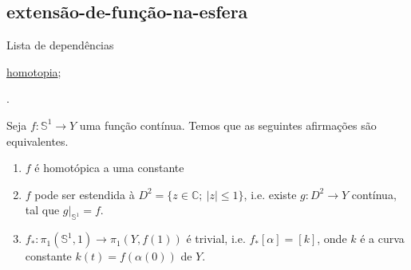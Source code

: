 \subsection{extensão-de-função-na-esfera} %
\label{extensão-de-função-na-esfera}
\begin{titlemize}{Lista de dependências}
	\item \hyperref[homotopia]{homotopia};
\end{titlemize}
.
\begin{lemma}
    Seja $f:\mathbb{S}^1 \rightarrow Y$ uma função contínua. Temos que as seguintes afirmações são equivalentes.

    \begin{enumerate}
        \item $f$ é homotópica a uma constante
        \item $f$ pode ser estendida à $D^2 = \{z \in \mathbb{C}; \ |z| \leq 1\}$, i.e. existe $g:D^2 \rightarrow Y$ contínua, tal que $g|_{\mathbb{S}^1} = f$.
        \item $f_*: \pi_1(\mathbb{S}^1, 1) \rightarrow \pi_1(Y, f(1))$ é trivial, i.e. $f_*[\alpha] = [k]$, onde $k$ é a curva constante $k(t) = f(\alpha(0))$ de $Y$.
    \end{enumerate}
\end{lemma}

